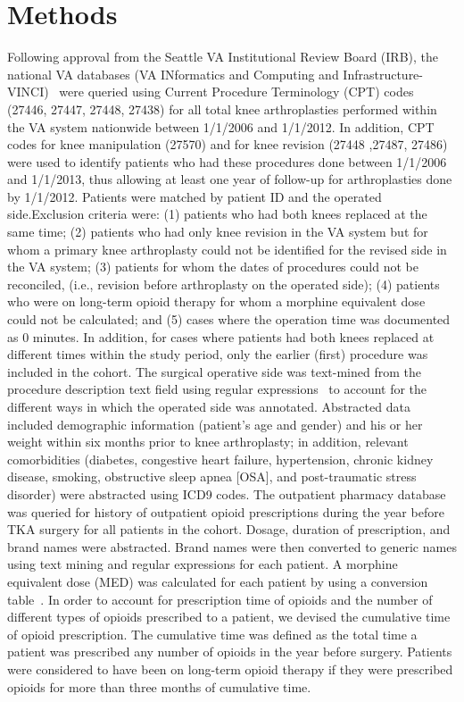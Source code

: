 \documentclass[a4paper]{article}
\begin{document}
\section*{Methods}
Following approval from the Seattle VA Institutional Review Board (IRB), the national VA databases (VA INformatics and Computing and Infrastructure- VINCI)~\cite{Vinci} were queried using Current Procedure Terminology (CPT) codes (27446, 27447, 27448, 27438) for all total knee arthroplasties performed within the
 VA system nationwide between 1/1/2006 and 1/1/2012. In addition, CPT codes for knee manipulation (27570) and for knee revision (27448 ,27487, 27486) were used to identify patients who had these procedures done between 1/1/2006 and 1/1/2013, thus allowing at least one year of follow-up for arthroplasties done by 1/1/2012.
Patients were matched by patient ID and the operated side.\newline Exclusion criteria were: (1) patients who had both knees replaced at the same time; (2) patients who had only knee revision in the VA system but for whom a primary knee arthroplasty could not be identified for the revised side in the VA system; (3) patients for whom the dates of procedures could not be reconciled, (i.e., revision before arthroplasty on the operated side); (4) patients who were on long-term opioid therapy for whom a morphine equivalent dose could not be calculated; and (5) cases where the operation time was documented as 0 minutes. In addition, for cases where patients had both knees replaced at different times within the study period, only the earlier (first) procedure was included in the cohort. The surgical operative side was text-mined from the procedure description text field using regular expressions~\cite{regex} to account for the different ways in which the operated side was annotated. 
Abstracted data included demographic information (patient’s age and gender) and his or her weight within six months prior to knee arthroplasty; in addition, relevant comorbidities (diabetes, congestive heart failure, hypertension, chronic kidney disease, smoking, obstructive sleep apnea [OSA], and post-traumatic stress disorder) were abstracted using ICD9 codes.\newline 
The outpatient pharmacy database was queried for history of outpatient opioid prescriptions during the year before TKA surgery for all patients in the cohort. Dosage, duration of prescription, and brand names were abstracted. Brand names were then converted to generic names using text mining and regular expressions for each patient. A morphine equivalent dose (MED) was calculated for each patient by using a conversion table~\cite{equi}. In order to account for prescription time of opioids and the number of different types of opioids prescribed to a patient, we devised the cumulative time of opioid prescription. The cumulative time was defined as the total time a patient was prescribed any number of opioids in the year before surgery. Patients were considered to have been on long-term opioid therapy if they were prescribed opioids for more than three months of cumulative time.
\end{document}
